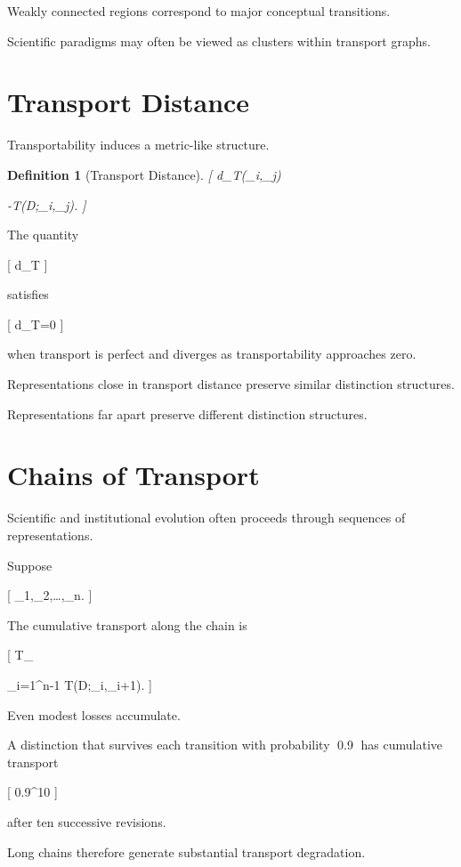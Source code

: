 \documentclass[11pt,oneside,openany]{book}
\newtheorem{definition}{Definition}[chapter] \newtheorem{theorem}{Theorem}[chapter] \newtheorem{proposition}{Proposition}[chapter] \newtheorem{lemma}{Lemma}[chapter] \newtheorem{corollary}{Corollary}[chapter] \newtheorem{remark}{Remark}[chapter]
\begin{document}
Weakly connected regions correspond to major conceptual transitions.

Scientific paradigms may often be viewed as clusters within transport graphs.

\section{Transport Distance}

Transportability induces a metric-like structure.

\begin{definition}[Transport Distance]

[
d_T(\pi_i,\pi_j)

-\log T(D;\pi_i,\pi_j).
]

\end{definition}

The quantity

[
d_T
]

satisfies

[
d_T=0
]

when transport is perfect and diverges as transportability approaches zero.

Representations close in transport distance preserve similar distinction structures.

Representations far apart preserve different distinction structures.

\section{Chains of Transport}

Scientific and institutional evolution often proceeds through sequences of representations.

Suppose

[
\pi_1,\pi_2,\ldots,\pi_n.
]

The cumulative transport along the chain is

[
T_{}

\prod_{i=1}^{n-1}
T(D;\pi_i,\pi_{i+1}).
]

Even modest losses accumulate.

A distinction that survives each transition with probability 0.9 has cumulative transport

[
0.9^{10}
]

after ten successive revisions.

Long chains therefore generate substantial transport degradation.
\end{document}
